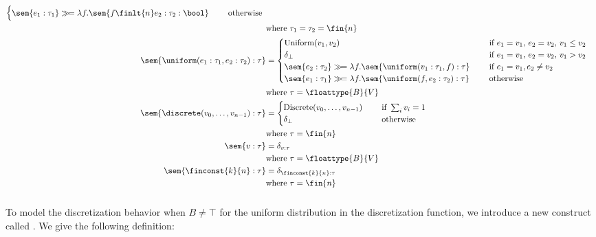{\begin{align*}
\begin{cases}
		\sem{ e_1 : \tau_1 } \gg\!= \lambda f. \sem{ f \finlt{n} e_2 : \tau_2 : \bool} \quad &\text{ otherwise } \\
	\end{cases} \\
	&\text{where } \tau_1 = \tau_2 = \fin{n} \\
	\sem{ \uniform(e_1 : \tau_1, e_2 : \tau_2) : \tau } &= \begin{cases}
		\text{Uniform}{(v_1, v_2)} \quad &\text{ if $e_1 = v_1$, $e_2 = v_2$, $v_1 \leq v_2$} \\
		\delta_{\bot} \quad &\text{ if $e_1 = v_1$, $e_2 = v_2$, $v_1 > v_2$} \\
		\sem{ e_2 : \tau_2 } \gg\!= \lambda f. \sem{ \uniform(v_1 : \tau_1, f) : \tau } \quad &\text{ if } e_1 = v_1, e_2 \neq v_2 \\
		\sem{ e_1 : \tau_1 } \gg\!= \lambda f. \sem{ \uniform(f, e_2 : \tau_2) : \tau } \quad &\text{ otherwise } \\
	\end{cases} \\
	&\text{where } \tau = \floattype{B}{V} \\
	\sem{ \discrete(v_0, \ldots, v_{n-1}) : \tau } &= \begin{cases}
		\text{Discrete}{(v_0, \ldots, v_{n-1})} \quad &\text{ if } \sum_i v_i = 1 \\
		\delta_{\bot} \quad &\text{ otherwise }
	\end{cases} \\
	&\text{where } \tau = \fin{n} \\
	\sem{ v : \tau } &= \delta_{v:\tau} \\
	&\text{where } \tau = \floattype{B}{V} \\
	\sem{ \finconst{k}{n} : \tau } &= \delta_{\finconst{k}{n} : \tau} \\
	&\text{where } \tau = \fin{n} \\
\end{align*}
}

\subsubsection{\dc}
To model the discretization behavior when $B \neq \top$ for the uniform distribution in the discretization function, we introduce a new construct called \dc. We give the following definition:

